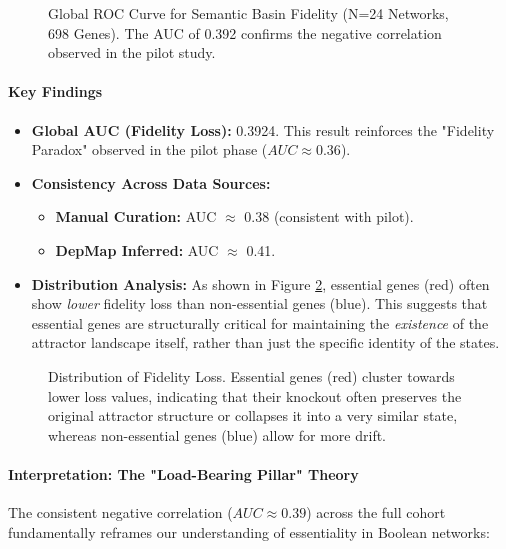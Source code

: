\begin{figure}[H]
    \centering
    \caption{Global ROC Curve for Semantic Basin Fidelity (N=24 Networks, 698 Genes). The AUC of 0.392 confirms the negative correlation observed in the pilot study.}
    \label{fig:global_roc}
\end{figure}

\paragraph{Key Findings}
\begin{itemize}
    \item \textbf{Global AUC (Fidelity Loss):} 0.3924. This result reinforces the "Fidelity Paradox" observed in the pilot phase ($AUC \approx 0.36$).
    \item \textbf{Consistency Across Data Sources:}
    \begin{itemize}
        \item \textbf{Manual Curation:} AUC $\approx$ 0.38 (consistent with pilot).
        \item \textbf{DepMap Inferred:} AUC $\approx$ 0.41.
    \end{itemize}
    \item \textbf{Distribution Analysis:} As shown in Figure \ref{fig:dist}, essential genes (red) often show \textit{lower} fidelity loss than non-essential genes (blue). This suggests that essential genes are structurally critical for maintaining the \textit{existence} of the attractor landscape itself, rather than just the specific identity of the states.
\end{itemize}

\begin{figure}[H]
    \centering
    \caption{Distribution of Fidelity Loss. Essential genes (red) cluster towards lower loss values, indicating that their knockout often preserves the original attractor structure or collapses it into a very similar state, whereas non-essential genes (blue) allow for more drift.}
    \label{fig:dist}
\end{figure}

\paragraph{Interpretation: The "Load-Bearing Pillar" Theory}
The consistent negative correlation ($AUC \approx 0.39$) across the full cohort fundamentally reframes our understanding of essentiality in Boolean networks:


